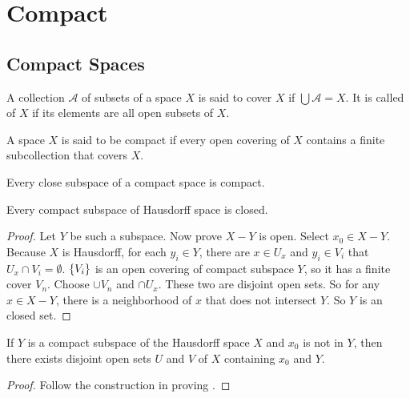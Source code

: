 \chapter{Compact}



\section{Compact Spaces}

\begin{definition}
    A collection $\mathcal{A}$ of subsets of a space $X$ is said to cover $X$ if $\bigcup \mathcal{A} = X$. It is called  of $X$ if its elements are all open subsets of $X$.
\end{definition}

\begin{definition}
    A space $X$ is said to be compact if every open covering of $X$ contains a finite subcollection that covers $X$.
\end{definition}

\begin{theorem}
    Every close subspace of a compact space is compact.    
\end{theorem}

\begin{theorem}\label{compact_subspace_closed}
    Every compact subspace of Hausdorff space is closed.    
\end{theorem}
\begin{proof}
    Let $Y$ be such a subspace. Now prove $X - Y$ is open. Select $x_0 \in X - Y$. Because $X$ is Hausdorff, for each $y_i \in Y$, there are $x \in U_x$ and $y_i \in V_i$ that $U_x \cap V_i = \emptyset$. $\set{V_i}$ is an open covering of compact subspace $Y$, so it has a finite cover $V_n$. Choose $\cup V_n$ and $\cap U_x$. These two are disjoint open sets. So for any $x \in X - Y$, there is a neighborhood of $x$ that does not intersect $Y$. So $Y$ is an closed set.
\end{proof}

\begin{theorem}\label{disjoint_openset_of_x_and_compact_set}
    If $Y$ is a compact subspace of the Hausdorff space $X$ and $x_0$ is not in $Y$, then there exists disjoint open sets $U$ and $V$ of $X$ containing $x_0$ and $Y$.    
\end{theorem}
\begin{proof}
    Follow the construction in proving .
\end{proof}

